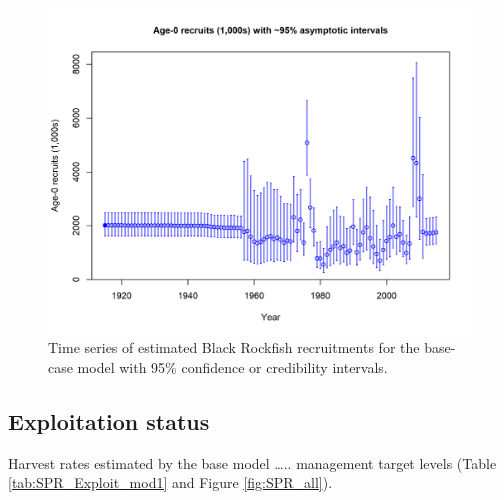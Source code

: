 \documentclass[12pt,]{article}
\begin{document}
\FloatBarrier

\begin{figure}[htbp]
\centering
\includegraphics{r4ss/plots_mod1/ts11_Age-0_recruits_(1000s)_with_95_asymptotic_intervals.png}
\caption{Time series of estimated Black Rockfish recruitments for the
base-case model with 95\% confidence or credibility intervals.
\label{fig:Recruits_all}}
\end{figure}

\FloatBarrier

\subsection*{Exploitation status}\label{exploitation-status}

Harvest rates estimated by the base model \ldots{}.. management target
levels (Table \ref{tab:SPR_Exploit_mod1} and Figure \ref{fig:SPR_all}).

\FloatBarrier
\end{document}
